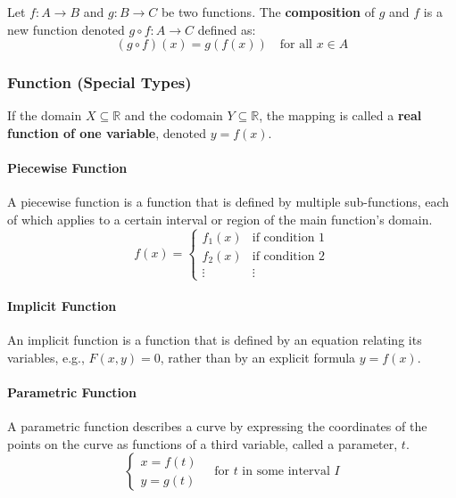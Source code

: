 \documentclass[oneside]{book}
\begin{document}
\begin{definition}
Let $f: A \to B$ and $g: B \to C$ be two functions. The \textbf{composition} of $g$ and $f$ is a new function denoted $g \circ f: A \to C$ defined as:
$$ (g \circ f)(x) = g(f(x)) \quad \text{for all } x \in A $$
\end{definition}

\subsubsection{Function (Special Types)}
\begin{definition}
If the domain $X \subseteq \mathbb{R}$ and the codomain $Y \subseteq \mathbb{R}$, the mapping is called a \textbf{real function of one variable}, denoted $y = f(x)$.
\end{definition}

\paragraph{Piecewise Function}
A piecewise function is a function that is defined by multiple sub-functions, each of which applies to a certain interval or region of the main function's domain.
$$ f(x) = \begin{cases}
    f_1(x) & \text{if condition 1} \\
    f_2(x) & \text{if condition 2} \\
    \vdots & \vdots
    \end{cases} $$
    
\paragraph{Implicit Function}
An implicit function is a function that is defined by an equation relating its variables, e.g., $F(x,y) = 0$, rather than by an explicit formula $y = f(x)$.

\paragraph{Parametric Function}
A parametric function describes a curve by expressing the coordinates of the points on the curve as functions of a third variable, called a parameter, $t$.
$$ \begin{cases}
    x = f(t) \\
    y = g(t)
    \end{cases} \quad \text{for } t \text{ in some interval } I $$
    
\end{document}
